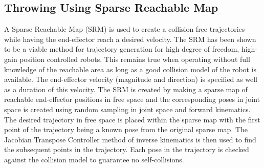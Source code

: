\subsection{Throwing Using Sparse Reachable Map}\label{sec:sec:srm}

A Sparse Reachable Map (SRM) is used to create a collision free trajectories while having the end-effector reach a desired velocity\cite{dlofaro-srm}.
The SRM has been shown to be a viable method for trajectory generation for high degree of freedom, high-gain position controlled robots.  This remains true when operating without full knowledge of the reachable area as long as a good collision model of the robot is available. 
The end-effector velocity (magnitude and direction) is specified as well as a duration of this velocity. 
The SRM is created by making a sparse map of reachable end-effector positions in free space and the corresponding poses in joint space is created using random sampling in joint space and forward kinematics. 
The desired trajectory in free space is placed within the sparse map with the first point of the trajectory being a known pose from the original sparse map. 
The Jacobian Transpose Controller method of inverse kinematics is then used to find the subsequent points in the trajectory. 
Each pose in the trajectory is checked against the collision model to guarantee no self-collisions. 